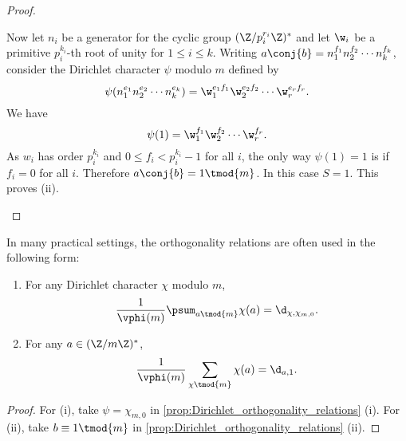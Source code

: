 \begin{proof}
\begin{enumerate}[label=(\roman*)]
\[          \]
          Now let $n_{i}$ be a generator for the cyclic group $(\Z/p_{i}^{r_{i}}\Z)^{\ast}$ and let $\w_{i}$ be a primitive $p_{i}^{k_{i}}$-th root of unity for $1 \le i \le k$. Writing $a\conj{b} = n_{1}^{f_{1}}n_{2}^{f_{2}} \cdots n_{k}^{f_{k}}$, consider the Dirichlet character $\psi$ modulo $m$ defined by
          \[
            \psi(n_{1}^{e_{1}}n_{2}^{e_{2}} \cdots n_{k}^{e_{k}}) = \w_{1}^{e_{1}f_{1}}\w_{2}^{e_{2}f_{2}} \cdots \w_{r}^{e_{r}f_{r}}.
          \]
          We have
          \[
            \psi(1) = \w_{1}^{f_{1}}\w_{2}^{f_{2}} \cdots \w_{r}^{f_{r}}.
          \]
          As $w_{i}$ has order $p_{i}^{k_{i}}$ and $0 \le f_{i} < p_{i}^{k_{i}}-1$ for all $i$, the only way $\psi(1) = 1$ is if $f_{i} = 0$ for all $i$. Therefore $a\conj{b} = 1 \tmod{m}$. In this case $S = 1$. This proves (ii).
        \end{enumerate}
      \end{proof}

      In many practical settings, the orthogonality relations are often used in the following form:

      \begin{corollary}\label{cor:Dirichlet_orthogonality_relations}
      \phantom{ }
        \begin{enumerate}[label=(\roman*)]
          \item For any Dirichlet character $\chi$ modulo $m$,
          \[
            \frac{1}{\vphi(m)}\psum_{a \tmod{m}}\chi(a) = \d_{\chi,\chi_{m,0}}.
          \]
          \item For any $a \in (\Z/m\Z)^{\ast}$,
          \[
            \frac{1}{\vphi(m)}\sum_{\chi \tmod{m}}\chi(a) = \d_{a,1}.
          \]
        \end{enumerate}
      \end{corollary}
      \begin{proof}
        For (i), take $\psi = \chi_{m,0}$ in \cref{prop:Dirichlet_orthogonality_relations} (i). For (ii), take $b \equiv 1 \tmod{m}$ in \cref{prop:Dirichlet_orthogonality_relations} (ii).
      \end{proof}

